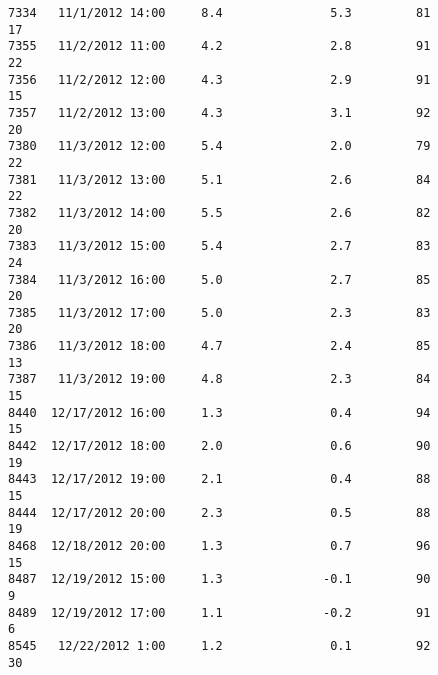 \documentclass[11pt]{article}
\begin{document}
\begin{tcolorbox}[breakable, size=fbox, boxrule=.5pt, pad at break*=1mm, opacityfill=0]
\begin{Verbatim}[commandchars=\\\{\}]
7334   11/1/2012 14:00     8.4               5.3         81               17
7355   11/2/2012 11:00     4.2               2.8         91               22
7356   11/2/2012 12:00     4.3               2.9         91               15
7357   11/2/2012 13:00     4.3               3.1         92               20
7380   11/3/2012 12:00     5.4               2.0         79               22
7381   11/3/2012 13:00     5.1               2.6         84               22
7382   11/3/2012 14:00     5.5               2.6         82               20
7383   11/3/2012 15:00     5.4               2.7         83               24
7384   11/3/2012 16:00     5.0               2.7         85               20
7385   11/3/2012 17:00     5.0               2.3         83               20
7386   11/3/2012 18:00     4.7               2.4         85               13
7387   11/3/2012 19:00     4.8               2.3         84               15
8440  12/17/2012 16:00     1.3               0.4         94               15
8442  12/17/2012 18:00     2.0               0.6         90               19
8443  12/17/2012 19:00     2.1               0.4         88               15
8444  12/17/2012 20:00     2.3               0.5         88               19
8468  12/18/2012 20:00     1.3               0.7         96               15
8487  12/19/2012 15:00     1.3              -0.1         90                9
8489  12/19/2012 17:00     1.1              -0.2         91                6
8545   12/22/2012 1:00     1.2               0.1         92               30


\end{Verbatim}
\end{tcolorbox}
\end{document}
